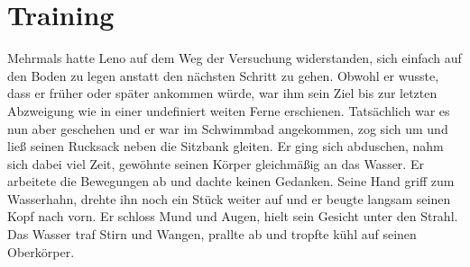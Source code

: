 \documentclass[ngerman,smalldemyvopaper,11pt,oneside,onecolumn,openright,extrafontsizes]{memoir}
\begin{document}
\chapter{Training}
Mehrmals hatte Leno auf dem Weg der Versuchung widerstanden, sich einfach auf den Boden zu legen anstatt den nächsten Schritt zu gehen. Obwohl er wusste, dass er früher oder später ankommen würde, war ihm sein Ziel bis zur letzten Abzweigung wie in einer undefiniert weiten Ferne erschienen. Tatsächlich war es nun aber geschehen und er war im Schwimmbad angekommen, zog sich um und ließ seinen Rucksack neben die Sitzbank gleiten. Er ging sich abduschen, nahm sich dabei viel Zeit, gewöhnte seinen Körper gleichmäßig an das Wasser. Er arbeitete die Bewegungen ab und dachte keinen Gedanken. Seine Hand griff zum Wasserhahn, drehte ihn noch ein Stück weiter auf und er beugte langsam seinen Kopf nach vorn. Er schloss Mund und Augen, hielt sein Gesicht unter den Strahl. Das Wasser traf Stirn und Wangen, prallte ab und tropfte kühl auf seinen Oberkörper.\\
\end{document}
